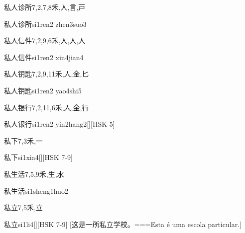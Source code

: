 \begin{Entry}{私人诊所}{7,2,7,8}{⽲,⼈,⾔,⼾}
  \begin{Phonetics}{私人诊所}{si1ren2 zhen3suo3}
  \end{Phonetics}
\end{Entry}

\begin{Entry}{私人信件}{7,2,9,6}{⽲,⼈,⼈,⼈}
  \begin{Phonetics}{私人信件}{si1ren2 xin4jian4}
  \end{Phonetics}
\end{Entry}

\begin{Entry}{私人钥匙}{7,2,9,11}{⽲,⼈,⾦,⼔}
  \begin{Phonetics}{私人钥匙}{si1ren2 yao4shi5}
  \end{Phonetics}
\end{Entry}

\begin{Entry}{私人银行}{7,2,11,6}{⽲,⼈,⾦,⾏}
  \begin{Phonetics}{私人银行}{si1ren2 yin2hang2}[][HSK 5]
  \end{Phonetics}
\end{Entry}

\begin{Entry}{私下}{7,3}{⽲,⼀}
  \begin{Phonetics}{私下}{si1xia4}[][HSK 7-9]
  \end{Phonetics}
\end{Entry}

\begin{Entry}{私生活}{7,5,9}{⽲,⽣,⽔}
  \begin{Phonetics}{私生活}{si1sheng1huo2}
  \end{Phonetics}
\end{Entry}

\begin{Entry}{私立}{7,5}{⽲,⽴}
  \begin{Phonetics}{私立}{si1li4}[][HSK 7-9]
    [这是一所私立学校。===Esta é uma escola particular.]
  \end{Phonetics}
\end{Entry}

